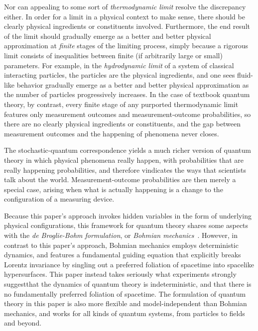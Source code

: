 \documentclass[12pt,english,prl,superscriptaddress,nobibnotes,nofootinbib]{revtex4-2}
\begin{document}
Nor can appealing to some sort of \emph{thermodynamic limit} resolve
the discrepancy either. In order for a limit in a physical context
to make sense, there should be clearly physical ingredients or constituents
involved. Furthermore, the end result of the limit should gradually
emerge as a better and better physical approximation at \emph{finite}
stages of the limiting process, simply because a rigorous limit consists
of inequalities between finite (if arbitrarily large or small) parameters.
For example, in the \emph{hydrodynamic limit} of a system of classical
interacting particles, the particles are the physical ingredients,
and one sees fluid-like behavior gradually emerge as a better and
better physical approximation as the number of particles progressively
increases. In the case of textbook quantum theory, by contrast, every
finite stage of any purported thermodynamic limit features only measurement
outcomes and measurement-outcome probabilities, so there are no clearly
physical ingredients or constituents, and the gap between measurement
outcomes and the happening of phenomena never closes.

The stochastic-quantum correspondence yields a much richer version
of quantum theory in which physical phenomena really happen, with
probabilities that are really happening probabilities, and therefore
vindicates the ways that scientists talk about the world. Measurement-outcome
probabilities are then merely a special case, arising when what is
actually happening is a change to the configuration of a measuring
device.

Because  this paper's approach invokes hidden variables in the form
of underlying physical configurations, this framework for quantum
theory shares some aspects with the \emph{de Broglie-Bohm formulation},
or \emph{Bohmian mechanics}~\citep{deBroglie:1930iswm,Bohm:1952siqtthvi,Bohm:1952siqtthvii}.
However, in contrast to this paper's approach, Bohmian mechanics
employs deterministic dynamics, and features a fundamental guiding
equation that explicitly breaks Lorentz invariance by singling out
a preferred foliation of spacetime into spacelike hypersurfaces. This
paper instead takes seriously what experiments strongly suggest\textemdash that
the dynamics of quantum theory is indeterministic, and that there
is no fundamentally preferred foliation of spacetime. The formulation
of quantum theory in this paper is also more flexible and model-independent
than Bohmian mechanics, and works for all kinds of quantum systems,
from particles to fields and beyond.
\end{document}
